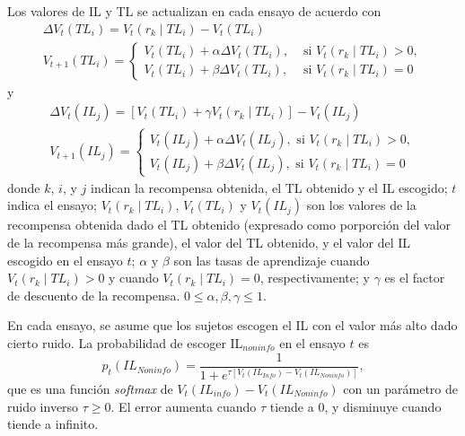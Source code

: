 \documentclass[a4paper,12pt]{article}
\begin{document}
Los valores de IL y TL se actualizan en cada ensayo de acuerdo con
$$
\begin{array}{l}
	\Delta V_{t}\left(T L_{i}\right)=V_{t}\left(r_{k} \mid T L_{i}\right)-V_{t}\left(T L_{i}\right) \\
	V_{t+1}\left(T L_{i}\right)=\left\{\begin{array}{ll}
			V_{t}\left(T L_{i}\right)+\alpha \Delta V_{t}\left(T L_{i}\right), & \mbox { si } V_{t}\left(r_{k} \mid T L_{i}\right)>0, \\
			V_{t}\left(T L_{i}\right)+\beta \Delta V_{t}\left(T L_{i}\right), & \mbox { si } V_{t}\left(r_{k} \mid T L_{i}\right)=0
		\end{array}\right.
	\end{array}
$$
y
$$
\begin{array}{l}
	\Delta V_{t}\left(I L_{j}\right)=\left[V_{t}\left(T L_{i}\right)+\gamma V_{t}\left(r_{k} \mid T L_{i}\right)\right]-V_{t}\left(I L_{j}\right) \\
	V_{t+1}\left(I L_{j}\right)=\left\{\begin{array}{l}
		V_{t}\left(I L_{j}\right)+\alpha \Delta V_{t}\left(I L_{j}\right), \mbox { si } V_{t}\left(r_{k} \mid T L_{i}\right)>0, \\
	V_{t}\left(I L_{j}\right)+\beta \Delta V_{t}\left(I L_{j}\right), \mbox { si } V_{t}\left(r_{k} \mid T L_{i}\right)=0
\end{array}\right.
\end{array}
$$
donde $k$, $i$, y $j$ indican la recompensa obtenida, el TL obtenido y el IL escogido; $t$ indica el ensayo; $V_t(r_k\mid TL_i)$, $V_t(TL_i)$ y $V_t(IL_j)$ son los valores de la recompensa obtenida dado el TL obtenido (expresado como porporción del valor de la recompensa más grande), el valor del TL obtenido, y el valor del IL escogido en el ensayo $t$; $\alpha$ y $\beta$ son las tasas de aprendizaje cuando $V_t(r_k\mid TL_i)>0$ y cuando $V_t(r_k\mid TL_i)=0$, respectivamente; y $\gamma$ es el factor de descuento de la recompensa. $0 \leq \alpha, \beta, \gamma \leq 1$.

En cada ensayo, se asume que los sujetos escogen el IL con el valor más alto dado cierto ruido. La probabilidad de escoger IL$_{noninfo}$ en el ensayo $t$ es
$$
p_{t}(IL_{Noninfo})=\frac{1}{1+e^{\tau\left[V_{t}\left(I L_{Info}\right)-V_{t}\left(I L_{Noninfo}\right)\right]}},
$$
que es una función {\slshape softmax} de $V_t(IL_{info})-V_t(IL_{Noninfo})$ con un parámetro de ruido inverso $\tau\geq 0$. El error aumenta cuando $\tau$ tiende a 0, y disminuye cuando tiende a infinito.
\end{document}
